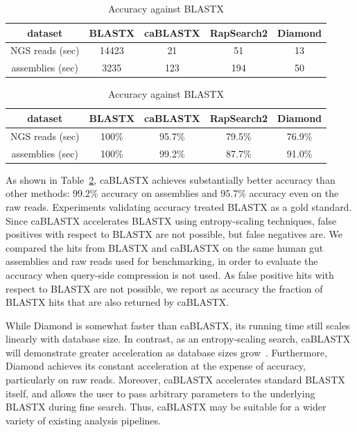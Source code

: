 \documentclass[review,preprint,12pt]{elsarticle}
\renewcommand{\cite}{\citep} %
\theoremstyle{definition}
\theoremstyle{remark}
\numberwithin{equation}{section}
\begin{document}
\begin{table}
\caption{(a) Running time and (b) accuracy of BLASTX, caBLASTX, RapSearch2, and Diamond}
\begin{subtable}{1\textwidth}
\caption{Running time}
\label{mgspeed}
\begin{tabular}{ccccc}
\hline
dataset & BLASTX & caBLASTX & RapSearch2 & Diamond \\
\hline
NGS reads (sec) & 14423 & 21 & 51 & 13 \\
\hline
assemblies (sec) & 3235 & 123 & 194 & 50 \\
\hline
\end{tabular}
\end{subtable}

\begin{subtable}{1\textwidth}
\caption{Accuracy against BLASTX}
\label{mgacc}
\begin{tabular}{ccccc}
\hline
dataset & BLASTX & caBLASTX & RapSearch2 & Diamond \\
\hline
NGS reads (sec) & 100\% & 95.7\% & 79.5\% & 76.9\% \\
\hline
assemblies (sec) & 100\% & 99.2\% & 87.7\% & 91.0\% \\
\hline
\end{tabular}
\end{subtable}
\end{table}

As shown in Table~\ref{mgacc}, caBLASTX achieves substantially better accuracy
than other methods: 99.2\% accuracy on assemblies and 95.7\% 
accuracy even on the raw reads.
Experiments validating accuracy treated BLASTX as a gold standard. 
Since caBLASTX accelerates BLASTX
using entropy-scaling techniques, false positives with respect to BLASTX are 
not possible, but false negatives are.
We compared the hits from BLASTX and caBLASTX on the same human gut
assemblies and raw reads used for benchmarking, in order to evaluate the accuracy when
query-side compression is not used.
As false positive hits with respect to BLASTX are not possible, we report as 
accuracy the fraction of BLASTX hits that are also returned by caBLASTX.

While Diamond is somewhat faster than caBLASTX, its running time still scales
linearly with database size.
In contrast, as an entropy-scaling search, caBLASTX will demonstrate greater
acceleration as database sizes grow~\cite{daniels2013compressive}.
Furthermore, Diamond achieves its constant acceleration at the expense of 
accuracy, particularly on raw reads.
Moreover, caBLASTX accelerates standard BLASTX itself, and allows the
user to pass arbitrary parameters to the underlying BLASTX during fine search.
Thus, caBLASTX may be suitable for a wider variety of existing analysis 
pipelines.
\end{document}
